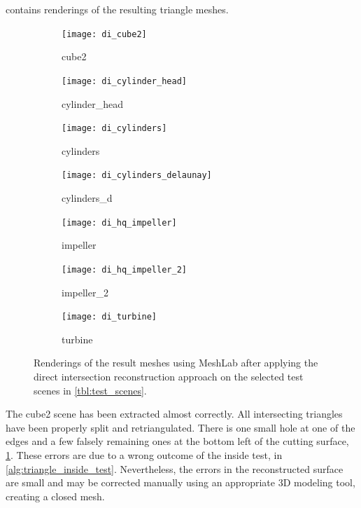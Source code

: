  contains renderings of the resulting triangle meshes.
%
\begin{figure}[!]
	\centering
	\begin{subfigure}[b]{0.34\textwidth}
		\centering
		\texttt{[image: di\_cube2]}
		\caption{cube2}
		\label{fig:di_cube2}
	\end{subfigure}
	\hspace{1cm}
	\begin{subfigure}[b]{0.34\textwidth}
		\centering
		\texttt{[image: di\_cylinder\_head]}
		\caption{cylinder\_head}
		\label{fig:di_cylinder_head}
	\end{subfigure}
	\begin{subfigure}[b]{0.34\textwidth}
		\centering
		\texttt{[image: di\_cylinders]}
		\caption{cylinders}
		\label{fig:di_cylinders}
	\end{subfigure}
	\hspace{1cm}
	\begin{subfigure}[b]{0.34\textwidth}
		\centering
		\texttt{[image: di\_cylinders\_delaunay]}
		\caption{cylinders\_d}
		\label{fig:di_cylinders_d}
	\end{subfigure}
	\begin{subfigure}[b]{0.34\textwidth}
		\centering
		\texttt{[image: di\_hq\_impeller]}
		\caption{impeller}
		\label{fig:di_impeller}
	\end{subfigure}
	\hspace{1cm}
	\begin{subfigure}[b]{0.34\textwidth}
		\centering
		\texttt{[image: di\_hq\_impeller\_2]}
		\caption{impeller\_2}
		\label{fig:di_impeller_2}
	\end{subfigure}
	\begin{subfigure}[b]{0.33\textwidth}
		\centering
		\texttt{[image: di\_turbine]}
		\caption{turbine}
		\label{fig:di_turbine}
	\end{subfigure}
	\caption{
		Renderings of the result meshes using MeshLab after applying the direct intersection reconstruction approach on the selected test scenes in \cref{tbl:test_scenes}.
	}
	\label{fig:di_results}
\end{figure}
%
The cube2 scene has been extracted almost correctly.
All intersecting triangles have been properly split and retriangulated.
There is one small hole at one of the edges and a few falsely remaining ones at the bottom left of the cutting surface, \cf \cref{fig:di_cube2}.
These errors are due to a wrong outcome of the inside test, \cf {} in \cref{alg:triangle_inside_test}.
Nevertheless, the errors in the reconstructed surface are small and may be corrected manually using an appropriate 3D modeling tool, creating a closed mesh.

